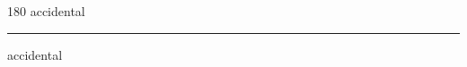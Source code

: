 
\begin{frame}
\begin{center}
\begin{turn}{180}
{\fontsize{2.5cm}{1em}\selectfont accidental}
\end{turn}
\vspace{1em}\par  
\hrule
\vspace{1em}\par  
{\fontsize{2.5cm}{1em}\selectfont accidental}
\end{center}
\end{frame}

